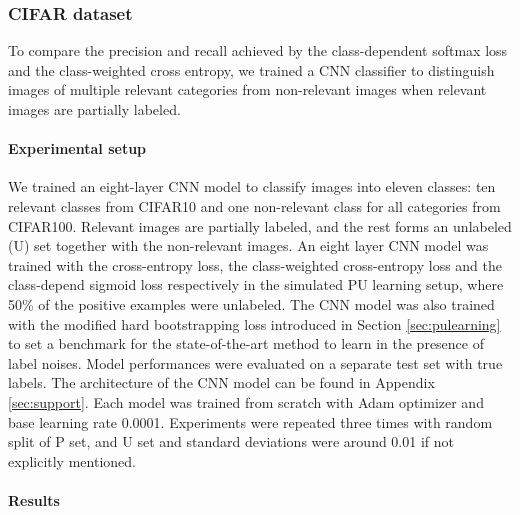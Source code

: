 \subsubsection{CIFAR dataset}

To compare the precision and recall achieved by the class-dependent softmax loss and the class-weighted cross entropy, we trained a CNN classifier to distinguish images of multiple relevant categories from non-relevant images when relevant images are partially labeled.

\paragraph{Experimental setup}
We trained an eight-layer CNN model to classify images into eleven classes: ten relevant classes from CIFAR10 and one non-relevant class for all categories from CIFAR100.
Relevant images are partially labeled, and the rest forms an unlabeled (U) set together with the non-relevant images.
An eight layer CNN model was trained with the cross-entropy loss, the class-weighted cross-entropy loss and the class-depend sigmoid loss respectively in the simulated PU learning setup, where 50\% of the positive examples were unlabeled.
The CNN model was also trained with the modified hard bootstrapping loss introduced in Section \ref{sec:pulearning} to set a benchmark for the state-of-the-art method to learn in the presence of label noises.
Model performances were evaluated on a separate test set with true labels.
The architecture of the CNN model can be found in Appendix \ref{sec:support}.
Each model was trained from scratch with Adam optimizer and base learning rate 0.0001.
Experiments were repeated three times with random split of P set, and U set and standard deviations were around 0.01 if not explicitly mentioned.


\paragraph{Results}

